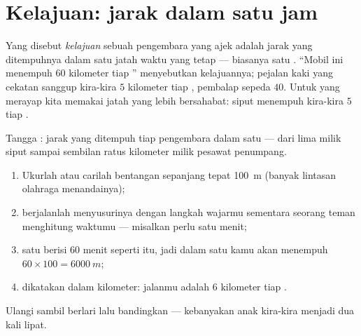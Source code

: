 \section{Kelajuan: jarak dalam satu jam}

\begin{definition}[Kelajuan]\label{def:g5:speed-distance-time:speed}
Yang disebut \emph{kelajuan} sebuah pengembara yang
ajek adalah jarak yang ditempuhnya dalam satu jatah waktu yang tetap
--- biasanya satu . ``Mobil ini menempuh $60$ kilometer tiap ''
menyebutkan kelajuannya; pejalan kaki yang cekatan sanggup kira-kira
$5$ kilometer tiap , pembalap sepeda $40$. Untuk yang merayap kita
memakai jatah yang lebih bersahabat: siput menempuh kira-kira $5$
 tiap .
\end{definition}

\begin{omfigure}

{\small Tangga : jarak yang ditempuh tiap pengembara dalam
satu  --- dari lima  milik siput sampai sembilan ratus
kilometer milik pesawat penumpang.}
\end{omfigure}

\begin{method}\label{met:g5:speed-distance-time:measure}
\begin{enumerate}
  \item Ukurlah atau carilah bentangan sepanjang tepat \qty{100}{m}
        (banyak lintasan olahraga menandainya);
  \item berjalanlah menyusurinya dengan langkah wajarmu sementara
        seorang teman menghitung waktumu --- misalkan perlu satu
        menit;
  \item satu  berisi $60$ menit seperti itu, jadi dalam satu 
        kamu akan menempuh $60 \times 100 = \qty{6000}{m}$;
  \item dikatakan dalam kilometer:  jalanmu adalah $6$
        kilometer tiap .
\end{enumerate}
Ulangi sambil berlari lalu bandingkan --- kebanyakan anak kira-kira
menjadi dua kali lipat.
\end{method}

